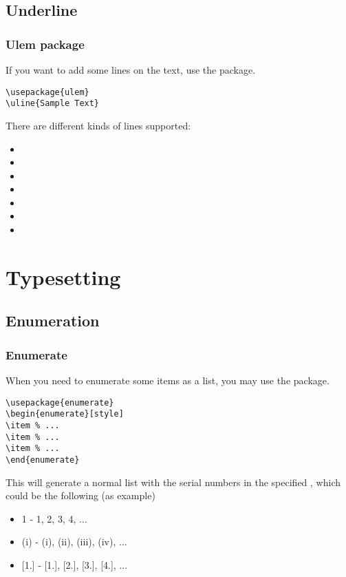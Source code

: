 \subsection{Underline}

\begin{frame}[fragile]
	\frametitle{Ulem package}
	If you want to add some lines on the text, use the  package.
	\begin{command}
		\begin{verbatim}
\usepackage{ulem}
\uline{Sample Text}
		\end{verbatim}
	\end{command}
	There are different kinds of lines supported:
	\begin{itemize}
		\item {}
		\item {}
		\item {}
		\item {}
		\item {}
		\item {}
		\item {}
	\end{itemize}
\end{frame}

\section{Typesetting}
\begin{frame}
\end{frame}

\subsection{Enumeration}
\begin{frame}[fragile]
	\frametitle{Enumerate}
	When you need to enumerate some items as a list, you may use the  package.
	\begin{command}
		\begin{verbatim}
\usepackage{enumerate}
\begin{enumerate}[style]
\item % ...
\item % ...
\item % ...
\end{enumerate}
		\end{verbatim}
	\end{command}
	This will generate a normal list with the serial numbers in the specified , which could be the following (as example)
	\begin{itemize}
		\item \alert{1} - 1, 2, 3, 4, ...
		\item \alert{(i)} - (i), (ii), (iii), (iv), ...
		\item \alert{[1.]} - [1.], [2.], [3.], [4.], ...
	\end{itemize}
\end{frame}

